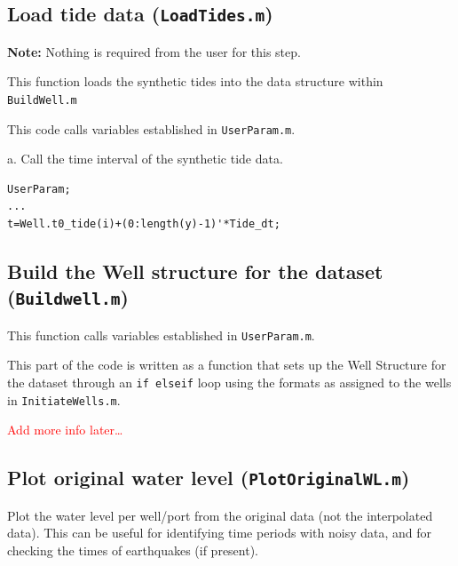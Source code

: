 \documentclass[11pt]{article}
\begin{document}
\subsection{Load tide data (\texttt{LoadTides.m})}

\textbf{Note:} Nothing is required from the user for this step.

This function loads the synthetic tides into the data structure within \texttt{BuildWell.m}

This code calls variables established in \texttt{UserParam.m}.

a.     Call the time interval of the synthetic tide data.

\begin{verbatim}
UserParam;
...
t=Well.t0_tide(i)+(0:length(y)-1)'*Tide_dt; 
\end{verbatim}

\subsection{Build the Well structure for the dataset (\texttt{Buildwell.m})}

This function calls variables established in \texttt{UserParam.m}.

This part of the code is written as a function that sets up the Well Structure
for the dataset through an \texttt{if elseif} loop using the formats as assigned to
the wells in \texttt{InitiateWells.m}.

\textcolor{red}{Add more info later\dots}


\subsection{Plot original water level (\texttt{PlotOriginalWL.m})}

Plot the water level per well/port from the original data (not the interpolated
data).  This can be useful for identifying time periods with noisy data, and
for checking the times of earthquakes (if present).
\end{document}
